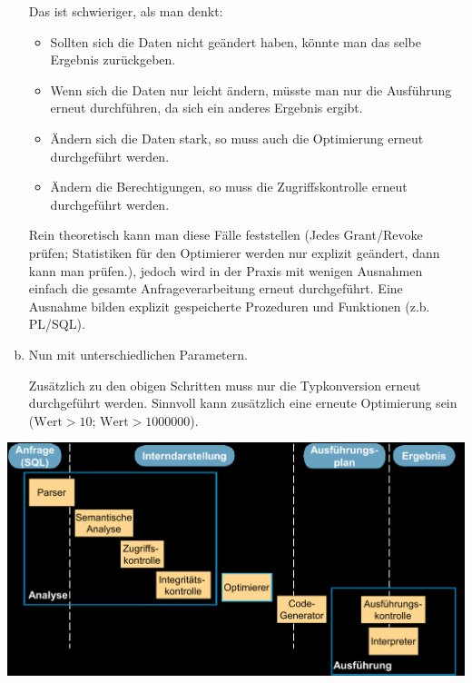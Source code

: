 \begin{enumerate}[a)]
	\begin{solution}
	Das ist schwieriger, als man denkt:
\begin{itemize}
	\item Sollten sich die Daten nicht geändert haben, könnte man das selbe Ergebnis zurückgeben.
	\item Wenn sich die Daten nur leicht ändern, müsste man nur die Ausführung erneut durchführen, da sich ein anderes Ergebnis ergibt.
	\item Ändern sich die Daten stark, so muss auch die Optimierung erneut durchgeführt werden.
	\item Ändern die Berechtigungen, so muss die Zugriffskontrolle erneut durchgeführt werden.
\end{itemize}
	Rein theoretisch kann man diese Fälle feststellen (Jedes Grant/Revoke prüfen; Statistiken für den Optimierer werden nur explizit geändert, dann kann man prüfen.),
	jedoch wird in der Praxis mit wenigen Ausnahmen einfach die gesamte Anfrageverarbeitung erneut durchgeführt.
	Eine Ausnahme bilden explizit gespeicherte Prozeduren und Funktionen (z.b. PL/SQL).
	\end{solution}

	\item Nun mit unterschiedlichen Parametern.

	\begin{solution}
	Zusätzlich zu den obigen Schritten muss nur die Typkonversion erneut durchgeführt werden.
	Sinnvoll kann zusätzlich eine erneute Optimierung sein ($\mathrm{Wert} > 10$; $\mathrm{Wert} > 1000000$).
	\end{solution}
\end{enumerate}
\begin{beamerText}
\includegraphics[width=1\linewidth]{Pictures/U10-Beamer-Anfrageverarbeitung}
\pagebreak
\end{beamerText}

